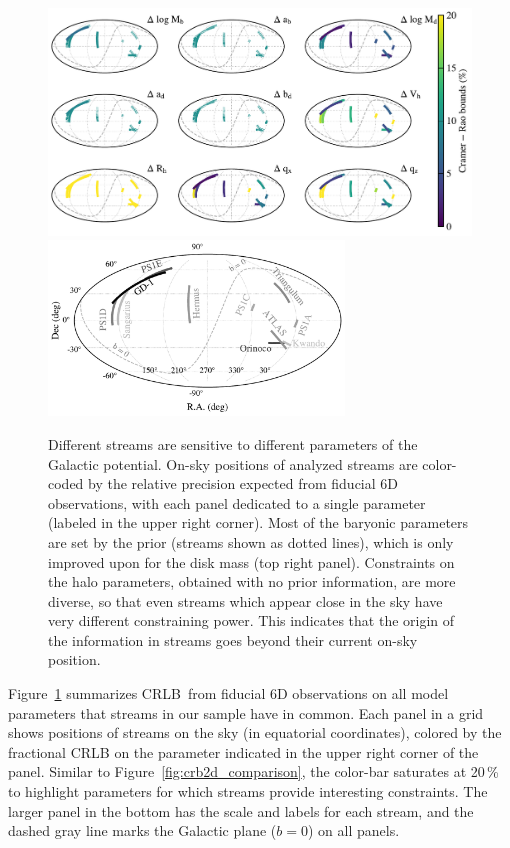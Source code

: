 \documentclass[modern]{aastex62}
\newcommand{\acronym}[1]{{\small{#1}}}
\newcommand{\CRLB}{\acronym{CRLB}}
\begin{document}
\begin{figure}
\begin{center}
\includegraphics[width=\textwidth]{crb_onsky_gal0.pdf}
\includegraphics[width=0.7\textwidth]{sky_legend_gal0.pdf}
\caption{Different streams are sensitive to different parameters of the Galactic potential.
On-sky positions of analyzed streams are color-coded by the relative precision expected from fiducial 6D observations, with each panel dedicated to a single parameter (labeled in the upper right corner).
Most of the baryonic parameters are set by the prior (streams shown as dotted lines), which is only improved upon for the disk mass (top right panel).
Constraints on the halo parameters, obtained with no prior information, are more diverse, so that even streams which appear close in the sky have very different constraining power.
This indicates that the origin of the information in streams goes beyond their current on-sky position.
}
\label{fig:sky_precision}
\end{center}
\end{figure}

Figure~\ref{fig:sky_precision} summarizes \CRLB\ from fiducial 6D observations on all model parameters that streams in our sample have in common.
Each panel in a grid shows positions of streams on the sky (in equatorial coordinates), colored by the fractional CRLB on the parameter indicated in the upper right corner of the panel.
Similar to Figure~\ref{fig:crb2d_comparison}, the color-bar saturates at 20\,\% to highlight parameters for which streams provide interesting constraints.
The larger panel in the bottom has the scale and labels for each stream, and the dashed gray line marks the Galactic plane ($b=0$) on all panels.
\end{document}
